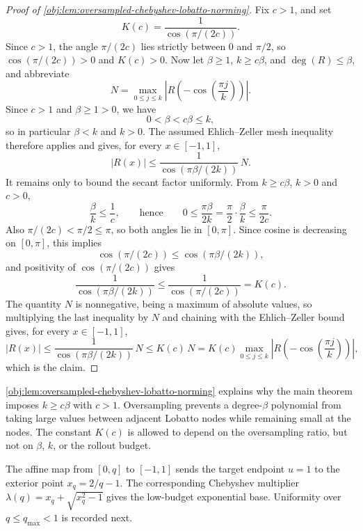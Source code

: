 \documentclass[11pt]{article}
\begin{document}
\begin{proof}[Proof of \cref{obj:lem:oversampled-chebyshev-lobatto-norming}]
Fix \(c>1\), and set
\[
K(c)=\frac{1}{\cos(\pi/(2c))}.
\]
Since \(c>1\), the angle \(\pi/(2c)\) lies strictly between \(0\) and \(\pi/2\), so \(\cos(\pi/(2c))>0\) and \(K(c)>0\). %
Now let \(\beta\ge1\), \(k\ge c\beta\), and \(\deg(R)\le\beta\), and abbreviate
\[
N=\max_{0\le j\le k}\left|R\!\left(-\cos\!\left(\frac{\pi j}{k}\right)\right)\right| .
\]
Since \(c>1\) and \(\beta\ge 1>0\), we have
\[
0<\beta<c\beta\le k ,
\]
so in particular \(\beta<k\) and \(k>0\). The assumed Ehlich--Zeller mesh inequality therefore applies and gives, for every \(x\in[-1,1]\),
\[
|R(x)|
\le
\frac{1}{\cos(\pi\beta/(2k))}\,N .
\] %
It remains only to bound the secant factor uniformly. From \(k\ge c\beta\), \(k>0\) and \(c>0\),
\[
\frac{\beta}{k}\le \frac1c,
\qquad\text{hence}\qquad
0\le \frac{\pi\beta}{2k}=\frac{\pi}{2}\cdot\frac{\beta}{k}\le \frac{\pi}{2c}.
\]
Also \(\pi/(2c)<\pi/2\le\pi\), so both angles lie in \([0,\pi]\). Since cosine is decreasing on \([0,\pi]\), this implies
\[
\cos(\pi/(2c))\le \cos(\pi\beta/(2k)),
\]
and positivity of \(\cos(\pi/(2c))\) gives
\[
\frac{1}{\cos(\pi\beta/(2k))}
\le
\frac{1}{\cos(\pi/(2c))}=K(c).
\] %
The quantity \(N\) is nonnegative, being a maximum of absolute values, so multiplying the last inequality by \(N\) and chaining with the Ehlich--Zeller bound gives, for every \(x\in[-1,1]\),
\[
|R(x)|
\le
\frac{1}{\cos(\pi\beta/(2k))}\,N
\le
K(c)\,N
=
K(c)\max_{0\le j\le k}\left|R\!\left(-\cos\!\left(\frac{\pi j}{k}\right)\right)\right| ,
\]
which is the claim. %
\end{proof}

\cref{obj:lem:oversampled-chebyshev-lobatto-norming} explains why the main theorem imposes \(k\ge c\beta\) with \(c>1\). Oversampling prevents a degree-\(\beta\) polynomial from taking large values between adjacent Lobatto nodes while remaining small at the nodes. The constant \(K(c)\) is allowed to depend on the oversampling ratio, but not on \(\beta\), \(k\), or the rollout budget.

The affine map from \([0,q]\) to \([-1,1]\) sends the target endpoint \(u=1\) to the exterior point \(x_q=2/q-1\). The corresponding Chebyshev multiplier \(\lambda(q)=x_q+\sqrt{x_q^2-1}\) gives the low-budget exponential base. Uniformity over \(q\le q_{\max}<1\) is recorded next.
\end{document}
